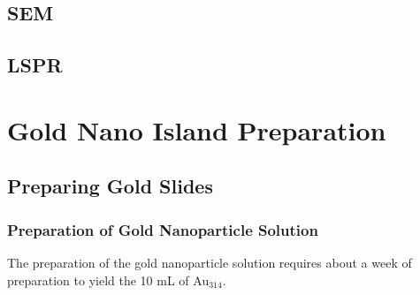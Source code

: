 \documentclass[12pt,oneside,english]{article}
\begin{document}
	\subsection{SEM}
	\subsection{LSPR}



	\section{Gold Nano Island Preparation}	

	\subsection{Preparing Gold Slides}
	
	\subsubsection{Preparation of Gold Nanoparticle Solution}
	The preparation of the gold nanoparticle solution requires about a week of preparation to yield the 10 mL of Au$_{314}$.
	
\end{document}
